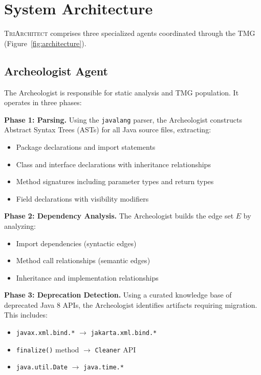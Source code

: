 \documentclass[sigconf,review,anonymous]{acmart}
\begin{document}
\section{System Architecture}
\label{sec:architecture}

\textsc{TriArchitect} comprises three specialized agents coordinated through the TMG (Figure~\ref{fig:architecture}).

\subsection{Archeologist Agent}

The Archeologist is responsible for static analysis and TMG population. It operates in three phases:

\textbf{Phase 1: Parsing.} Using the \texttt{javalang} parser, the Archeologist constructs Abstract Syntax Trees (ASTs) for all Java source files, extracting:
\begin{itemize}
    \item Package declarations and import statements
    \item Class and interface declarations with inheritance relationships
    \item Method signatures including parameter types and return types
    \item Field declarations with visibility modifiers
\end{itemize}

\textbf{Phase 2: Dependency Analysis.} The Archeologist builds the edge set $E$ by analyzing:
\begin{itemize}
    \item Import dependencies (syntactic edges)
    \item Method call relationships (semantic edges)
    \item Inheritance and implementation relationships
\end{itemize}

\textbf{Phase 3: Deprecation Detection.} Using a curated knowledge base of deprecated Java 8 APIs, the Archeologist identifies artifacts requiring migration. This includes:
\begin{itemize}
    \item \texttt{javax.xml.bind.*} $\rightarrow$ \texttt{jakarta.xml.bind.*}
    \item \texttt{finalize()} method $\rightarrow$ \texttt{Cleaner} API
    \item \texttt{java.util.Date} $\rightarrow$ \texttt{java.time.*}
\end{itemize}
\end{document}
